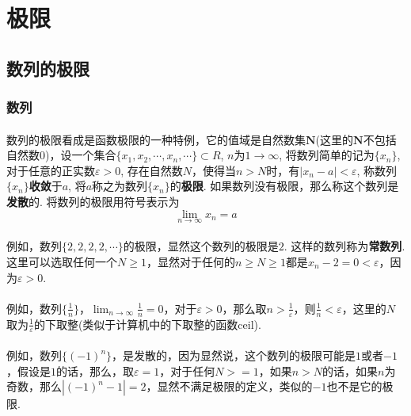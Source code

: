 \section{极限}

\subsection{数列的极限}

\subsubsection{数列}
\paragraph{}
数列的极限看成是函数极限的一种特例，它的值域是自然数集$\textbf{N}$(这里的$\textbf{N}$不包括自然数0)，设一个集合$\{x_1, x_2, \cdots, x_n, \cdots \} \subset R$, $n$为$1 \to \infty$, 将数列简单的记为$\{x_n\}$, 对于任意的正实数$\varepsilon > 0$, 存在自然数$N$，使得当$n > N$时，有$|x_n - a| < \varepsilon$, 称数列$\{x_n\}$\textbf{收敛}于$a$, 将$a$称之为数列$\{x_n\}$的\textbf{极限}. 如果数列没有极限，那么称这个数列是\textbf{发散}的. 将数列的极限用符号表示为
$$
\lim_{n\to \infty} x_n = a
$$

\paragraph{}
例如，数列$\{2, 2, 2, 2, \cdots \}$的极限，显然这个数列的极限是$2$.  这样的数列称为\textbf{常数列}.  这里可以选取任何一个$N \geq 1$，显然对于任何的$n \geq N \geq 1$都是$x_n - 2 = 0 < \varepsilon$，因为$\varepsilon > 0$. 

\paragraph{}
例如，数列$\{\frac{1}{n}\}$，$\lim_{n\to \infty} \frac{1}{n} = 0$，对于$\varepsilon > 0$，那么取$n > \frac{1}{\varepsilon}$，则$\frac{1}{n} < \varepsilon$，这里的$N$取为$\frac{1}{\varepsilon}$的下取整(类似于计算机中的下取整的函数ceil). 

\paragraph{}
例如，数列$\{(-1)^n\}$，是发散的，因为显然说，这个数列的极限可能是$1$或者$-1$，假设是$1$的话，那么，取$\varepsilon = 1$，对于任何$N >= 1$，如果$n > N$的话，如果$n$为奇数，那么$|(-1)^n - 1| = 2$，显然不满足极限的定义，类似的$-1$也不是它的极限. 

